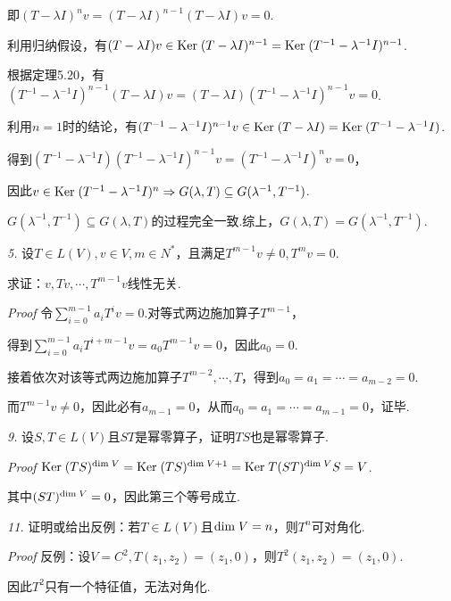 即\((T-\lambda I)^n v=(T-\lambda I)^{n-1}(T-\lambda I)v=0\).

利用归纳假设，有\((T-\lambda I)v \in \mathrm{Ker \;} (T-\lambda I)^{n-1}=\mathrm{Ker \;} (T^{-1}-\lambda^{-1} I)^{n-1}\).

根据定理5.20，有\((T^{-1}-\lambda^{-1} I)^{n-1}(T-\lambda I)v=(T-\lambda I)(T^{-1}-\lambda^{-1} I)^{n-1}v=0\).

利用\(n=1\)时的结论，有\((T^{-1}-\lambda^{-1} I)^{n-1}v \in \mathrm{Ker \;} (T-\lambda I)=\mathrm{Ker \;} (T^{-1}-\lambda^{-1} I)\).

得到\((T^{-1}-\lambda^{-1} I)(T^{-1}-\lambda^{-1} I)^{n-1}v=(T^{-1}-\lambda^{-1} I)^n v=0\)，

因此\(v \in \mathrm{Ker \;} (T^{-1}-\lambda^{-1} I)^n \Rightarrow G(\lambda,T) \subseteq G(\lambda^{-1},T^{-1})\).

\(G(\lambda^{-1},T^{-1}) \subseteq G(\lambda,T)\)的过程完全一致.综上，\(G(\lambda,T)=G(\lambda^{-1},T^{-1})\).

\hspace*{\fill}

\textit{5.}
设\(T \in L(V),v \in V,m \in N^*\)，且满足\(T^{m-1}v \ne 0,T^m v=0\).

求证：\(v,Tv,\cdots,T^{m-1}v\)线性无关.

\textit{Proof}
令\(\sum_{i=0}^{m-1} a_iT^i v=0\).对等式两边施加算子\(T^{m-1}\)，

得到\(\sum_{i=0}^{m-1} a_iT^{i+m-1} v=a_0T^{m-1} v=0\)，因此\(a_0=0\).

接着依次对该等式两边施加算子\(T^{m-2},\cdots,T\)，得到\(a_0=a_1=\cdots=a_{m-2}=0\).

而\(T^{m-1}v \ne 0\)，因此必有\(a_{m-1}=0\)，从而\(a_0=a_1=\cdots=a_{m-1}=0\)，证毕.

\hspace*{\fill}

\textit{9.}
设\(S,T \in L(V)\)且\(ST\)是幂零算子，证明\(TS\)也是幂零算子.

\textit{Proof}
\(\mathrm{Ker \;} (TS)^{\mathrm{dim \;} V}=\mathrm{Ker \;} (TS)^{\mathrm{dim \;} V+1}=\mathrm{Ker \;} T(ST)^{\mathrm{dim \;} V}S=V\).

其中\((ST)^{\mathrm{dim \;} V}=0\)，因此第三个等号成立.

\hspace*{\fill}

\textit{11.}
证明或给出反例：若\(T \in L(V)\)且\(\mathrm{dim \;} V=n\)，则\(T^n\)可对角化.

\textit{Proof}
反例：设\(V=C^2,T(z_1,z_2)=(z_1,0)\)，则\(T^2(z_1,z_2)=(z_1,0)\).

因此\(T^2\)只有一个特征值，无法对角化.

